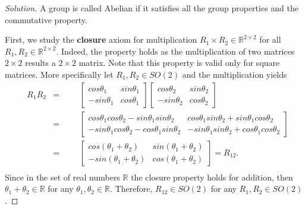 \documentclass[12pt]{article}
\newenvironment{solution}{\begin{proof}[Solution]}{\end{proof}}
\begin{document}
\begin{solution}
A group is called Abelian if it satisfies all the group properties and the commutative property. 

First, we study the \textbf{closure} axiom for multiplication $R_1\times R_2 \in \mathbb{R}^{2 \times 2}$ for all $R_1,R_2 \in \mathbb{R}^{2 \times 2}$. Indeed, the property holds as the multiplication of two matrices $2 \times 2$ results a $2 \times 2$ matrix. Note that this property is valid only for square matrices. More specifically let $R_1,R_2 \in SO(2)$ and the multiplication yields
\begin{equation*}
\begin{aligned}
& R_1 R_2
&  =
&&& \begin{bmatrix}
cos\theta_1 & sin\theta_1 \\
-sin\theta_1 & cos\theta_1
\end{bmatrix}\begin{bmatrix}
cos\theta_2 & sin\theta_2 \\
-sin\theta_2 & cos\theta_2
\end{bmatrix}\\
&& =
&&& \begin{bmatrix}
cos\theta_1cos\theta_2-sin\theta_1sin\theta_2 & cos\theta_1sin\theta_2+sin\theta_1cos\theta_2 \\
-sin\theta_1cos\theta_2-cos\theta_1sin\theta_2 & -sin\theta_1sin\theta_2+cos\theta_1cos\theta_2
\end{bmatrix}\\ 
&& =
&&&  \begin{bmatrix}
cos(\theta_1+\theta_2) & sin(\theta_1+\theta_2) \\
-sin(\theta_1+\theta_2) & cos(\theta_1+\theta_2)
\end{bmatrix}=R_{12}.\\
\end{aligned}
\end{equation*}
Since in the set of real numbers $\mathbb{R}$ the closure property holds for addition, then $\theta_1+ \theta_2 \in \mathbb{R}$ for any $\theta_1, \theta_2 \in \mathbb{R}$. Therefore, $R_{12} \in SO(2)$ for any $R_1,R_2 \in SO(2)$. 


\end{solution}
\end{document}
